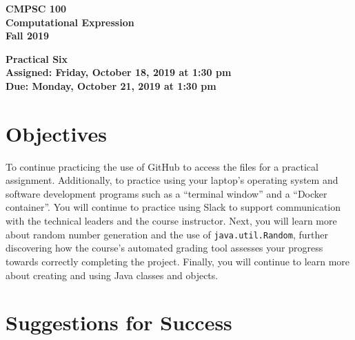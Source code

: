 \documentclass[11pt]{article}
\newcommand{\assignmentduedate}{October 21}
\newcommand{\assignmentassignedate}{October 18}
\newcommand{\assignmentnumber}{Six}
\newcommand{\labyear}{2019}
\newcommand{\labdueday}{Monday}
\newcommand{\labassignday}{Friday}
\newcommand{\labtime}{1:30 pm}
\newcommand{\assigneddate}{Assigned: \labassignday, \assignmentassignedate, \labyear{} at \labtime{}}
\newcommand{\duedate}{Due: \labdueday, \assignmentduedate, \labyear{} at \labtime{}}
\newcommand{\labtitle}[1]
{
  \begin{center}
    \begin{center}
      \bf
      CMPSC 100\\Computational Expression\\
      Fall 2019\\
      \medskip
    \end{center}
    \bf
    #1
  \end{center}
}
\begin{document}
\thispagestyle{empty}

\labtitle{Practical \assignmentnumber{} \\ \assigneddate{} \\ \duedate{}}

\section*{Objectives}

To continue practicing the use of GitHub to access the files for a practical
assignment. Additionally, to practice using your laptop's operating system and
software development programs such as a ``terminal window'' and a ``Docker
container''. You will continue to practice using Slack to support communication
with the technical leaders and the course instructor. Next, you will learn more
about random number generation and the use of {\tt java.util.Random}, further
discovering how the course's automated grading tool assesses your progress
towards correctly completing the project. Finally, you will continue to learn
more about creating and using Java classes and objects.

\section*{Suggestions for Success}
\end{document}
